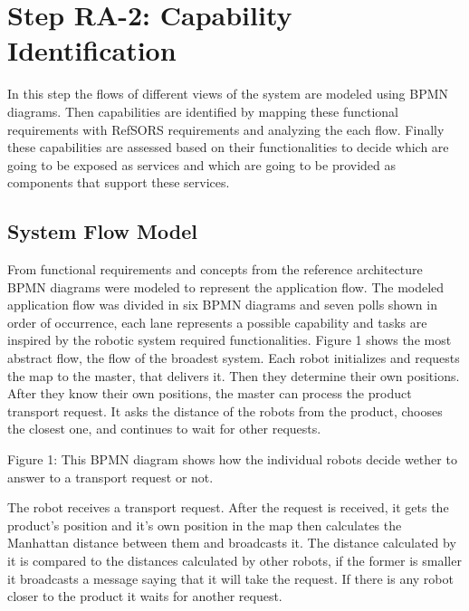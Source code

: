 \section{Step RA-2: Capability Identification}
In this step the flows of different views of the system are modeled using BPMN diagrams. Then capabilities are identified by mapping these functional requirements with RefSORS requirements and analyzing the each flow. Finally these capabilities are assessed based on their functionalities to decide which are going to be exposed as services and which are going to be provided as components that support these services.

\subsection{System Flow Model}
From functional requirements and concepts from the reference architecture BPMN diagrams were modeled to represent the application flow. The modeled application flow was divided in six BPMN diagrams and seven polls shown in order of occurrence, each lane represents a possible capability and tasks are inspired by the robotic system required functionalities.
Figure 1 shows the most abstract flow, the flow of the broadest system. Each robot initializes and requests the map to the master, that delivers it. Then they determine their own positions. After they know their own positions, the master can process the product transport request. It asks the distance of the robots from the product, chooses the closest one, and continues to wait for other requests.


Figure 1: This BPMN diagram shows how the individual robots decide wether to answer to a transport request or not.

The robot receives a transport request. After the request is received, it gets the product's position and it's own position in the map then calculates the Manhattan distance between them and broadcasts it. The distance calculated by it is compared to the distances calculated by other robots, if the former is smaller it broadcasts a message saying that it will take the request. If there is any robot closer to the product it waits for another request.



